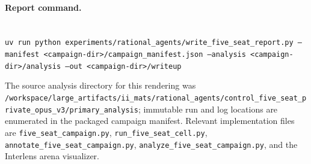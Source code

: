\documentclass[11pt]{article}
\begin{document}
\paragraph{Report command.}\mbox{}\\
\texttt{uv run python experiments/rational\_agents/write\_five\_seat\_report.py --manifest <campaign-dir>/campaign\_manifest.json --analysis <campaign-dir>/analysis --out <campaign-dir>/writeup}

The source analysis directory for this rendering was \texttt{/workspace/large\_artifacts/ii\_mats/rational\_agents/control\_five\_seat\_private\_opus\_v3/primary\_analysis}; immutable run and log
locations are enumerated in the packaged campaign manifest. Relevant implementation files are
\texttt{five\_seat\_campaign.py}, \texttt{run\_five\_seat\_cell.py},
\texttt{annotate\_five\_seat\_campaign.py}, \texttt{analyze\_five\_seat\_campaign.py}, and the Interlens
arena visualizer.
\end{document}
